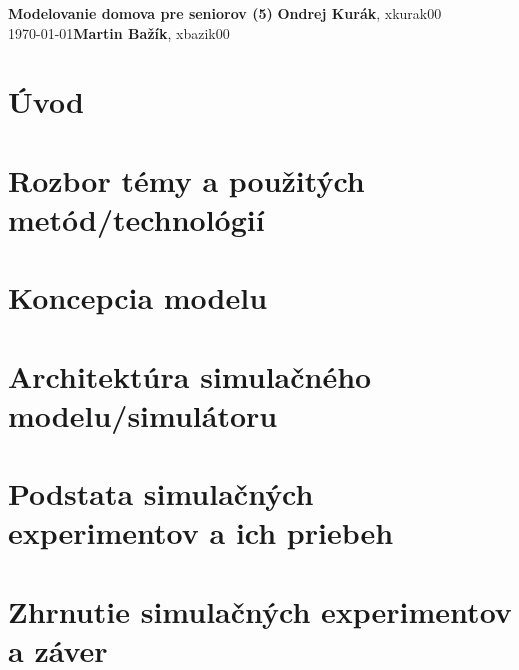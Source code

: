 \documentclass[a4paper, 11pt]{article}
\begin{document}
\noindent
\large\textbf{Modelovanie domova pre seniorov (5)} \hfill \textbf{Ondrej Kurák}, xkurak00 \\
\today \hfill \textbf{Martin Bažík}, xbazik00 \\


\section{Úvod}

\section{Rozbor témy a použitých metód/technológií}

\section{Koncepcia modelu}

\section{Architektúra simulačného modelu/simulátoru}

\section{Podstata simulačných experimentov a ich priebeh}

\section{Zhrnutie simulačných experimentov a záver}
\end{document}
